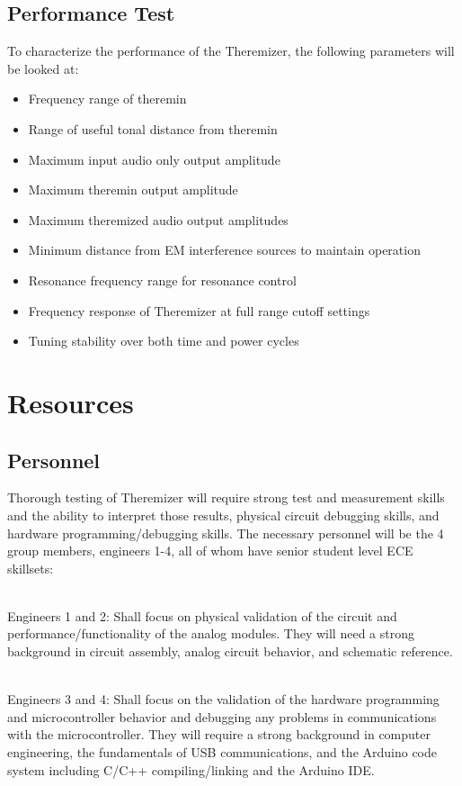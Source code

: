 \documentclass[a4paper,12pt]{article}
\begin{document}
	\subsection{Performance Test}
	To characterize the performance of the Theremizer, the following parameters will be looked at:
	\begin{itemize}
	    \item Frequency range of theremin
	    \item Range of useful tonal distance from theremin
	    \item Maximum input audio only output amplitude
	    \item Maximum theremin output amplitude
	    \item Maximum theremized audio output amplitudes
	    \item Minimum distance from EM interference sources to maintain operation
	    \item Resonance frequency range for resonance control
	    \item Frequency response of Theremizer at full range cutoff settings
	    \item Tuning stability over both time and power cycles
	\end{itemize}
	
	\section{Resources}
	\subsection{Personnel}
	Thorough testing of Theremizer will require strong test and measurement skills and the ability to interpret those results, physical circuit debugging skills, and hardware programming/debugging skills. The necessary personnel will be the 4 group members, engineers 1-4, all of whom have senior student level ECE skillsets:
	
	\\Engineers 1 and 2: Shall focus on physical validation of the circuit and performance/functionality of the analog modules. They will need a strong background in circuit assembly, analog circuit behavior, and schematic reference.
	
	\\Engineers 3 and 4: Shall focus on the validation of the hardware programming and microcontroller behavior and debugging any problems in communications with the microcontroller. They will require a strong background in computer engineering, the fundamentals of USB communications, and the Arduino code system including C/C++ compiling/linking and the Arduino IDE. 
	
\end{document}
